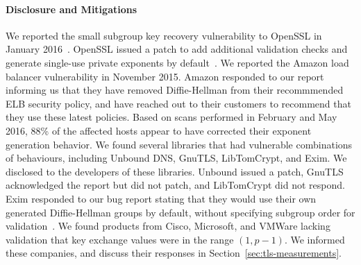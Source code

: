 \paragraph{Disclosure and Mitigations}
We reported the small subgroup key recovery vulnerability to OpenSSL in January
2016~\cite{asanso-unredacted}. OpenSSL issued a patch to add additional
validation checks and generate single-use private exponents by
default~\cite{cve-2016-0701}. We reported the Amazon load balancer
vulnerability in November 2015. Amazon responded to our report informing us
that they have removed Diffie-Hellman from their recommmended ELB security
policy, and have reached out to their customers to recommend that they use
these latest policies. Based on scans performed in February and May 2016, 88\%
of the affected hosts appear to have corrected their exponent generation
behavior. We found several libraries that had vulnerable combinations of
behaviours, including Unbound DNS, GnuTLS, LibTomCrypt, and Exim. We disclosed
to the developers of these libraries. Unbound issued a patch, GnuTLS
acknowledged the report but did not patch, and LibTomCrypt did not respond.
Exim responded to our bug report stating that they would use their own
generated Diffie-Hellman groups by default, without specifying subgroup order
for validation~\cite{exim-blog,exim-bug-report}.  We found products from Cisco,
Microsoft, and VMWare lacking validation that key exchange values were in
the range $(1,p-1)$. We informed these companies, and discuss their responses
in Section~\ref{sec:tls-measurements}.

